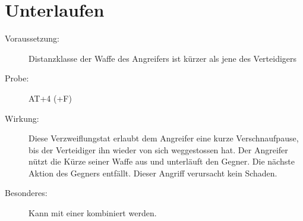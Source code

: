 \section{Unterlaufen}
\label{aktion.unterlaufen}
\begin{description}
    \item[Voraussetzung:]
        Distanzklasse der Waffe des Angreifers ist kürzer als jene des Verteidigers
    \item[Probe:]
        AT+4 (+F)
    \item[Wirkung:]
        Diese Verzweiflungstat erlaubt dem Angreifer eine kurze Verschnaufpause, bis der Verteidiger ihn wieder von sich weggestossen hat.
        Der Angreifer nützt die Kürze seiner Waffe aus und unterläuft den Gegner.
        Die nächste Aktion des Gegners entfällt.
        Dieser Angriff verursacht kein Schaden.
    \item[Besonderes:]
        Kann mit einer  kombiniert werden.
\end{description}

